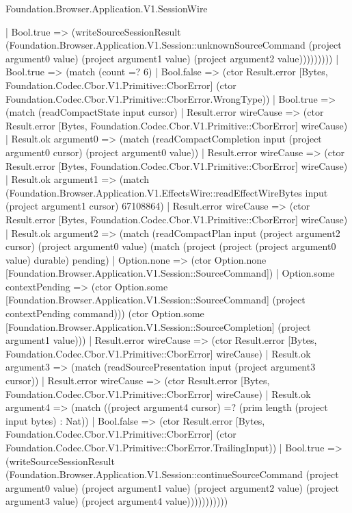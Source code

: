 \begin{lexlean}{Foundation.Browser.Application.V1.SessionWire}
\begin{semanticmodule}
{                        | Bool.true => (writeSourceSessionResult (Foundation.Browser.Application.V1.Session::unknownSourceCommand (project argument0 value) (project argument1 value) (project argument2 value)))))))))
            | Bool.true => (match (count =? 6)
              | Bool.false => (ctor Result.error [Bytes, Foundation.Codec.Cbor.V1.Primitive::CborError] (ctor Foundation.Codec.Cbor.V1.Primitive::CborError.WrongType))
              | Bool.true => (match (readCompactState input cursor)
                | Result.error wireCause => (ctor Result.error [Bytes, Foundation.Codec.Cbor.V1.Primitive::CborError] wireCause)
                | Result.ok argument0 => (match (readCompactCompletion input (project argument0 cursor) (project argument0 value))
                  | Result.error wireCause => (ctor Result.error [Bytes, Foundation.Codec.Cbor.V1.Primitive::CborError] wireCause)
                  | Result.ok argument1 => (match (Foundation.Browser.Application.V1.EffectsWire::readEffectWireBytes input (project argument1 cursor) 67108864)
                    | Result.error wireCause => (ctor Result.error [Bytes, Foundation.Codec.Cbor.V1.Primitive::CborError] wireCause)
                    | Result.ok argument2 => (match (readCompactPlan input (project argument2 cursor) (project argument0 value) (match (project (project (project argument0 value) durable) pending)
                        | Option.none => (ctor Option.none [Foundation.Browser.Application.V1.Session::SourceCommand])
                        | Option.some contextPending => (ctor Option.some [Foundation.Browser.Application.V1.Session::SourceCommand] (project contextPending command))) (ctor Option.some [Foundation.Browser.Application.V1.Session::SourceCompletion] (project argument1 value)))
                      | Result.error wireCause => (ctor Result.error [Bytes, Foundation.Codec.Cbor.V1.Primitive::CborError] wireCause)
                      | Result.ok argument3 => (match (readSourcePresentation input (project argument3 cursor))
                        | Result.error wireCause => (ctor Result.error [Bytes, Foundation.Codec.Cbor.V1.Primitive::CborError] wireCause)
                        | Result.ok argument4 => (match ((project argument4 cursor) =? (prim length (project input bytes) : Nat))
                          | Bool.false => (ctor Result.error [Bytes, Foundation.Codec.Cbor.V1.Primitive::CborError] (ctor Foundation.Codec.Cbor.V1.Primitive::CborError.TrailingInput))
                          | Bool.true => (writeSourceSessionResult (Foundation.Browser.Application.V1.Session::continueSourceCommand (project argument0 value) (project argument1 value) (project argument2 value) (project argument3 value) (project argument4 value)))))))))))
}
\end{semanticmodule}
\end{lexlean}

